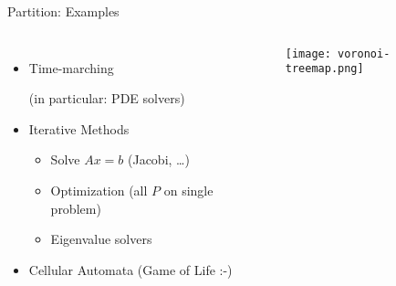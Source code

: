 \documentclass[english,compress]{beamer}
\begin{document}
\begin{frame}{Partition: Examples}
  \begin{columns}
      \begin{itemize}
        \item Time-marching

          (in particular: PDE solvers)
        \item Iterative Methods
          \begin{itemize}
            \item Solve $Ax=b$ (Jacobi, \dots)
            \item Optimization (all $P$ on single problem)
            \item Eigenvalue solvers
          \end{itemize}
        \item Cellular Automata (Game of Life :-)
      \end{itemize}
      \texttt{[image: voronoi-treemap.png]}
  \end{columns}
\end{frame}
\end{document}
